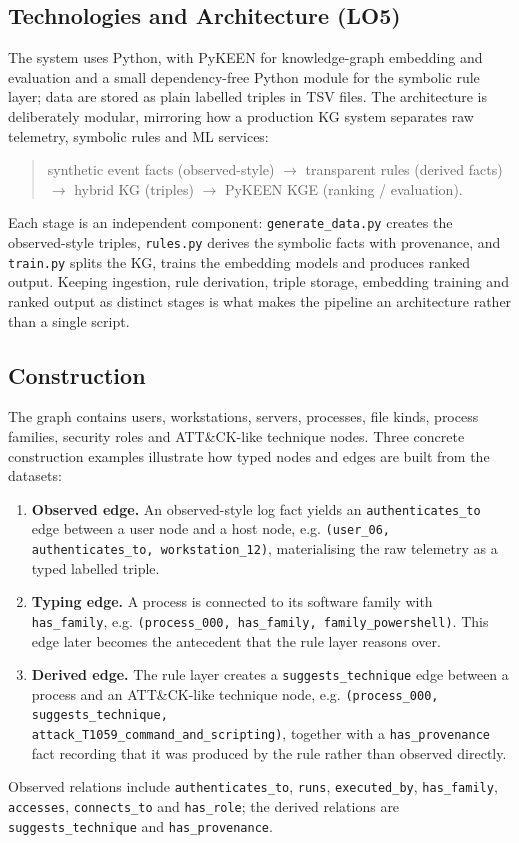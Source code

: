 \documentclass{article}
\begin{document}
\subsection{Technologies and Architecture (LO5)}
The system uses Python, with PyKEEN for knowledge-graph embedding and evaluation
and a small dependency-free Python module for the symbolic rule layer; data are
stored as plain labelled triples in TSV files. The architecture is deliberately
modular, mirroring how a production KG system separates raw telemetry, symbolic
rules and ML services:
\begin{quote}
synthetic event facts (observed-style) $\rightarrow$ transparent rules
(derived facts) $\rightarrow$ hybrid KG (triples) $\rightarrow$ PyKEEN KGE
(ranking / evaluation).
\end{quote}
Each stage is an independent component: \texttt{generate\_data.py} creates the
observed-style triples, \texttt{rules.py} derives the symbolic facts with
provenance, and \texttt{train.py} splits the KG, trains the embedding models and
produces ranked output. Keeping ingestion, rule derivation, triple storage,
embedding training and ranked output as distinct stages is what makes the
pipeline an architecture rather than a single script.

\subsection{Construction}
The graph contains users, workstations, servers, processes, file kinds, process
families, security roles and ATT\&CK-like technique nodes. Three concrete
construction examples illustrate how typed nodes and edges are built from the
datasets:
\begin{enumerate}
    \item \textbf{Observed edge.} An observed-style log fact yields an
    \texttt{authenticates\_to} edge between a user node and a host node, e.g.
    \texttt{(user\_06, authenticates\_to, workstation\_12)}, materialising the
    raw telemetry as a typed labelled triple.
    \item \textbf{Typing edge.} A process is connected to its software family
    with \texttt{has\_family}, e.g.
    \texttt{(process\_000, has\_family, family\_powershell)}. This edge later
    becomes the antecedent that the rule layer reasons over.
    \item \textbf{Derived edge.} The rule layer creates a
    \texttt{suggests\_technique} edge between a process and an ATT\&CK-like
    technique node, e.g.
    \texttt{(process\_000, suggests\_technique,\\ attack\_T1059\_command\_and\_scripting)},
    together with a \texttt{has\_provenance} fact recording that it was produced
    by the rule rather than observed directly.
\end{enumerate}
Observed relations include \texttt{authenticates\_to}, \texttt{runs},
\texttt{executed\_by}, \texttt{has\_family}, \texttt{accesses},
\texttt{connects\_to} and \texttt{has\_role}; the derived relations are
\texttt{suggests\_technique} and \texttt{has\_provenance}.
\end{document}
